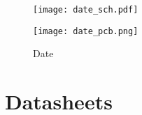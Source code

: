 \begin{figure}[h!]
\centering
\begin{minipage}[b]{1\textwidth}
\texttt{[image: date\_sch.pdf]}
\label{fig:date_sch}
\end{minipage}
\begin{minipage}[b]{1\textwidth}
\texttt{[image: date\_pcb.png]}
\label{fig:date_pcb}
\end{minipage}
\caption{Date}
\label{fig:date_sch_pcb}
\end{figure}

\chapter{Datasheets}\label{datasheets}
